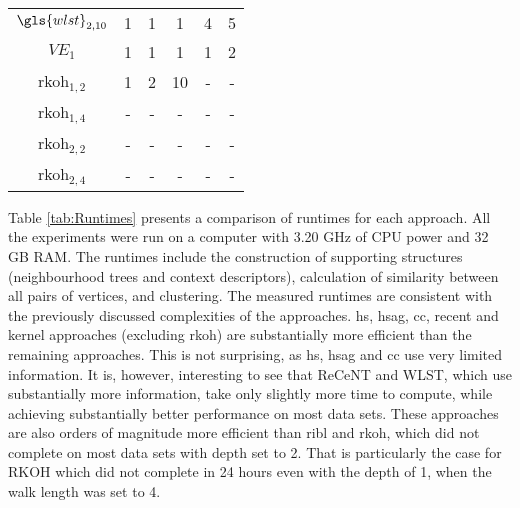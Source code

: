 \begin{table}
\begin{center}
\begin{tabular}[htb]{@{}cccccc@{}}
		$\gls{wlst}_{2,10}$	&	1		&	1	   &  	1	  &		4	   &   	5		\\

		$VE_1$			&	1		&	1	   &  	1	  &		1	   &   	2		\\

		\gls{rkoh}$_{1,2}$	&	1		&	2	   &  	10	  &	-		   &   -			\\

		\gls{rkoh}$_{1,4}$	&	-		&	-	   &  - 	  &  -	   &  - 		\\

		\gls{rkoh}$_{2,2}$	&	-		&	-	   &  - 	  &  -	   &  - 		\\

		\gls{rkoh}$_{2,4}$	&	-		&	-	   &  - 	  &  -	   &  - 		\\
		\bottomrule
		\end{tabular}

	\end{center}

\end{table}

Table \ref{tab:Runtimes} presents a comparison of runtimes for each approach.
All the experiments were run on a computer with 3.20 GHz of CPU power and 32 GB RAM.
The runtimes include the construction of supporting structures (neighbourhood trees and context descriptors), calculation of similarity between all pairs of vertices, and clustering.
The measured runtimes are consistent with the previously discussed complexities of the approaches.
\gls{hs}, \gls{hsag}, \gls{cc}, \gls{recent} and kernel approaches (excluding \gls{rkoh}) are substantially more efficient than the remaining approaches.
This is not surprising, as \gls{hs}, \gls{hsag} and \gls{cc}  use very limited information.
It is, however, interesting to see that ReCeNT and WLST,  which use substantially more information, take only slightly more time to compute, while achieving substantially better performance on most data sets.
These approaches are also orders of magnitude more efficient than \gls{ribl} and \gls{rkoh}, which did not complete on most data sets with depth set to 2.
That is particularly the case for RKOH which did not complete in 24 hours even with the depth of 1, when the walk length was set to 4.


